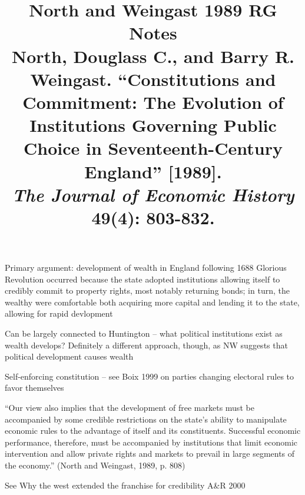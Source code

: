\documentclass[12pt]{article}
\title{\textbf{North and Weingast 1989 RG Notes}\\
\large North, Douglass C., and Barry R. Weingast. ``Constitutions and Commitment: The Evolution of Institutions Governing Public Choice in Seventeenth-Century England'' [1989].\\
\textit{The Journal of Economic History} 49(4): 803-832.}
\author{}
\date{}
\begin{document}
\maketitle

Primary argument: development of wealth in England following 1688 Glorious Revolution occurred because the state adopted institutions allowing itself to credibly commit to property rights, most notably returning bonds; in turn, the wealthy were comfortable both acquiring more capital and lending it to the state, allowing for rapid devlopment

Can be largely connected to Huntington -- what political institutions exist as wealth develops? Definitely a different approach, though, as NW suggests that political development causes wealth

Self-enforcing constitution -- see Boix 1999 on parties changing electoral rules to favor themselves

``Our view also implies that the development of free markets must be accompanied by some credible restrictions on the state's ability to manipulate economic rules to the advantage of itself and its constituents. Successful economic performance, therefore, must be accompanied by institutions that limit economic intervention and allow private rights and markets to prevail in large segments of the economy.'' (North and Weingast, 1989, p. 808)

See Why the west extended the franchise for credibility A\&R 2000
\end{document}
